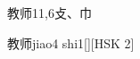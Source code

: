 \begin{entry}{教师}{11,6}{⽁、⼱}
  \begin{phonetics}{教师}{jiao4 shi1}[][HSK 2]
  \end{phonetics}
\end{entry}
